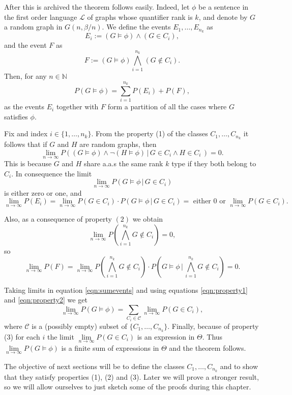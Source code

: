 \documentclass[11pt,notitlepage]{report}
\theoremstyle{definition}
\theoremstyle{remark}
\newcommand{\N}{\mathbb{N}}
\newcommand{\Lan}{\mathcal{L}}
\newcommand{\Ln}{\lim\limits_{n\to \infty}}
\begin{document}
After this is archived the theorem follows easily. Indeed, let $\phi$ be a sentence 
in the first order language $\Lan$ of graphs whose quantifier rank is $k$, and denote by
$G$ a random graph in $G(n,\beta/n)$. We define the events $E_1,\dots,E_{n_k}$ as
\[E_i:= (G \models \phi) \wedge (G \in C_i),\]
and the  event $F$ as
\[F:= (G \models \phi) \bigwedge_{i=1}^{n_k} (G \notin C_i).\]
Then, for any $n\in \N$
\begin{equation} \label{eqn:sumevents}
P(G\models \phi) = \sum_{i=1}^{n_k} P(E_i)  + P(F),
\end{equation}
as the events $E_i$ together with $F$ form a partition of all the cases where $G$ satisfies $\phi$. \par

Fix and index $i\in \{1, \dots, n_k\}$. From the property (1) of the classes $C_1,\dots, C_{n_k}$ 
it follows that if $G$ and $H$ are random graphs, then
\[\Ln P((G\models \phi) \wedge \neg(H\models \phi) \, | \, G\in C_i \wedge H\in C_i \, ) = 0.\]
This is because $G$ and $H$ share a.a.s the same rank $k$ type if they both belong to $C_i$. 
In consequence the limit
\[ \Ln P(G\models \phi \, | \, G\in C_i )\] 
is either zero or one, and 
\begin{equation}\label{eqn:property1}
\Ln P(E_i)= \Ln P(G\in C_i)\cdot P(G\models \phi \, | \, G\in C_i)= \text{ either } 0 \text{ or } \Ln P(G\in C_i).
\end{equation} 
\par 
Also, as a consequence of property $(2)$ we obtain
\[\Ln P(\bigwedge_{i=1}^{n_k} G \notin C_i)=0, \] 
so
\begin{equation}\label{eqn:property2}
\Ln P(F)= \Ln P(\bigwedge_{i=1}^{n_k} G \notin C_i)\cdot P(G\models \phi \, | \, \bigwedge_{i=1}^{n_k} G \notin C_i)=0.  
\end{equation}
\par
Taking limits in equation \ref{eqn:sumevents} and using equations \ref{eqn:property1} and \ref{eqn:property2} 
we get
\[ \Ln P(G\models \phi) = \sum\limits_{C_i\in \mathcal{C}} \Ln P(G \in C_i) ,\]
where $\mathcal{C}$ is a (possibly empty) subset of $\{C_1,\dots, C_{n_k}\}$.
Finally, because of property (3) for each $i$ the limit $\Ln P(G \in C_i)$ is 
an expression in $\Theta$. Thus $\Ln P(G\models \phi)$ is a finite sum of expressions in $\Theta$
and the theorem follows. \par

The objective of next sections will be to define the classes $C_1,\dots, C_{n_k}$ and to show
that they satisfy properties (1), (2) and (3). Later we will prove a stronger result, so we will
allow ourselves to just sketch some of the proofs during this chapter. 
\end{document}
